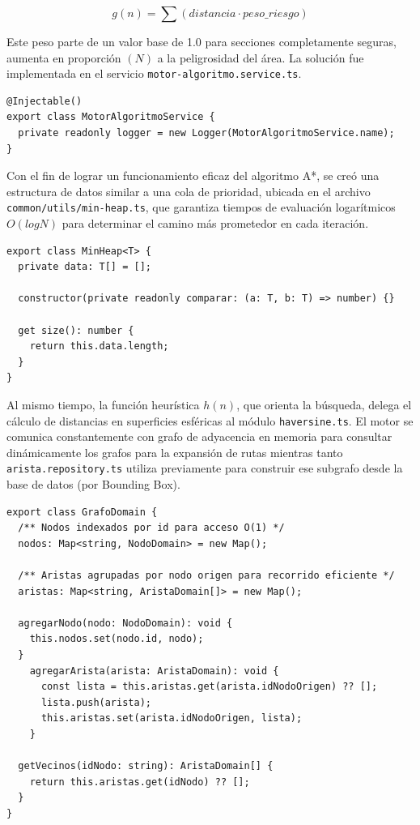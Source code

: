 \begin{equation}
g(n) = \sum (distancia \cdot peso\_riesgo)
\label{eq:gn}
\end{equation}


Este peso parte de un valor base de 1.0 para secciones completamente seguras, aumenta en proporción $(N)$ a la peligrosidad del área.  La solución fue implementada en el servicio  \texttt{motor-algoritmo.service.ts}. 

\begin{lstlisting}
@Injectable()
export class MotorAlgoritmoService {
  private readonly logger = new Logger(MotorAlgoritmoService.name);
}  
\end{lstlisting}

Con el fin de lograr un funcionamiento eficaz del algoritmo A*, se creó una estructura de datos similar a una cola de prioridad, ubicada en el archivo \texttt{common/\allowbreak utils/\allowbreak min-heap.ts}, que garantiza tiempos de evaluación logarítmicos $O(log N)$ para determinar el camino más prometedor en cada iteración.

\begin{lstlisting}
export class MinHeap<T> {
  private data: T[] = [];

  constructor(private readonly comparar: (a: T, b: T) => number) {}

  get size(): number {
    return this.data.length;
  }
}
\end{lstlisting}


Al mismo tiempo, la función heurística $h(n)$, que orienta la búsqueda, delega el cálculo de distancias en superficies esféricas al módulo \texttt{haversine.ts}. El motor se comunica constantemente con grafo de adyacencia en memoria para consultar dinámicamente los grafos para la expansión de rutas mientras tanto \texttt{arista.repository.ts} utiliza previamente para construir ese subgrafo desde la base de datos (por Bounding Box).

\begin{lstlisting}
export class GrafoDomain {
  /** Nodos indexados por id para acceso O(1) */
  nodos: Map<string, NodoDomain> = new Map();

  /** Aristas agrupadas por nodo origen para recorrido eficiente */
  aristas: Map<string, AristaDomain[]> = new Map();

  agregarNodo(nodo: NodoDomain): void {
    this.nodos.set(nodo.id, nodo);
  }
    agregarArista(arista: AristaDomain): void {
      const lista = this.aristas.get(arista.idNodoOrigen) ?? [];
      lista.push(arista);
      this.aristas.set(arista.idNodoOrigen, lista);
    }

  getVecinos(idNodo: string): AristaDomain[] {
    return this.aristas.get(idNodo) ?? [];
  }
}
\end{lstlisting}

